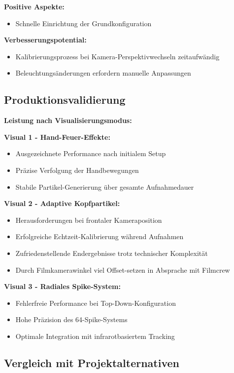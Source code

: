\textbf{Positive Aspekte:}
\begin{itemize}
    \item Schnelle Einrichtung der Grundkonfiguration
\end{itemize}

\textbf{Verbesserungspotential:}
\begin{itemize}
    \item Kalibrierungsprozess bei Kamera-Perspektivwechseln zeitaufwändig
    \item Beleuchtungsänderungen erfordern manuelle Anpassungen
\end{itemize}

\subsection{Produktionsvalidierung}

\textbf{Leistung nach Visualisierungsmodus:}

\textbf{Visual 1 - Hand-Feuer-Effekte:}
\begin{itemize}
    \item Ausgezeichnete Performance nach initialem Setup
    \item Präzise Verfolgung der Handbewegungen
    \item Stabile Partikel-Generierung über gesamte Aufnahmedauer
\end{itemize}

\textbf{Visual 2 - Adaptive Kopfpartikel:}
\begin{itemize}
    \item Herausforderungen bei frontaler Kameraposition
    \item Erfolgreiche Echtzeit-Kalibrierung während Aufnahmen
    \item Zufriedenstellende Endergebnisse trotz technischer Komplexität
    \item Durch Filmkamerawinkel viel Offset-setzen in Absprache mit Filmcrew
\end{itemize}

\textbf{Visual 3 - Radiales Spike-System:}
\begin{itemize}
    \item Fehlerfreie Performance bei Top-Down-Konfiguration
    \item Hohe Präzision des 64-Spike-Systems
    \item Optimale Integration mit infrarotbasiertem Tracking
\end{itemize}

\subsection{Vergleich mit Projektalternativen}

